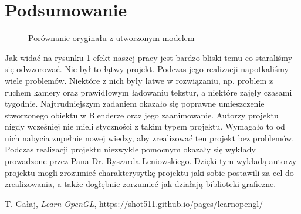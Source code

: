 \documentclass[a4paper,12pt]{article}
\numberwithin{equation}{section}
\begin{document}
\section{Podsumowanie}
\begin{figure}[h!]
    \centering
    \caption{Porównanie oryginału z utworzonym modelem}
    \label{fig:furgon}
\end{figure}

Jak widać na rysunku \ref{fig:furgon} efekt naszej pracy jest bardzo bliski temu co staraliśmy się odwzorować. Nie był to łątwy projekt. Podczas jego realizacji napotkaliśmy wiele problemów. Niektóre z nich były łatwe w rozwiązaniu, np. problem z ruchem kamery oraz prawidłowym ładowaniu tekstur, a niektóre zajęły czasami tygodnie. Najtrudniejszym zadaniem okazało się poprawne umieszczenie stworzonego obiektu w Blenderze oraz jego zaanimowanie. Autorzy projektu nigdy wcześniej nie mieli styczności z takim typem projektu. Wymagało to od nich nabycia zupełnie nowej wiedzy, aby zrealizować ten projekt bez problemów.
\newline
\indent Podczas realizacji projektu niezwykle pomocnym okazały się wykłady prowadzone przez Pana Dr. Ryszarda Leniowskiego. Dzięki tym wykładą autorzy projektu mogli zrozumieć charakterysytkę projektu jaki sobie postawili za cel do zrealizowania, a także dogłębnie zorzumieć jak działają biblioteki graficzne.



\begin{thebibliography}{9}
     T. Gałaj, \emph{Learn OpenGL}, \href{https://shot511.github.io/pages/learnopengl/}{https://shot511.github.io/pages/learnopengl/}
\end{thebibliography}
\end{document}
